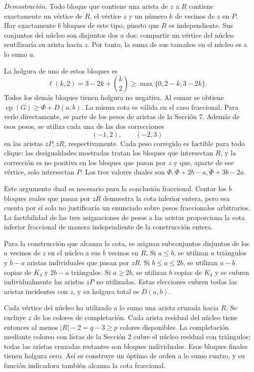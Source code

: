 \documentclass[spanish,11pt,a4paper]{article}
\begin{document}
\emph{Demostración.} Todo bloque que contiene una arista de \(z\) a
\(R\) contiene exactamente un vértice de \(R\), el vértice \(z\) y un
número \(k\) de vecinos de \(z\) en \(P\). Hay exactamente \(b\) bloques
de este tipo, puesto que \(R\) es independiente. Sus conjuntos del
núcleo son disjuntos dos a dos: compartir un vértice del núcleo
reutilizaría su arista hacia \(z\). Por tanto, la suma de sus tamaños en
el núcleo es a lo sumo \(a\).

La holgura de uno de estos bloques es \[
\ell(k,2)=3-2k+\binom k2\ge\max\{0,2-k,3-2k\}.
\] Todos los demás bloques tienen holgura no negativa. Al sumar se
obtiene \(\operatorname{cp}(G)\ge\Phi+D(a,b)\). La misma cota es válida
en el caso fraccional. Para verlo directamente, se parte de los pesos de
aristas de la Sección 7. Además de esos pesos, se utiliza cada una de
las dos correcciones \[
(-1,2),\qquad (-2,3)
\] en las aristas \(zP,zR\), respectivamente. Cada peso corregido es
factible para todo clique: las desigualdades mostradas tratan los
bloques que intersectan \(R\), y la corrección es no positiva en los
bloques que pasan por \(z\) y que, aparte de ese vértice, solo
intersectan \(P\). Los tres valores duales son
\(\Phi,\Phi+2b-a,\Phi+3b-2a\).

Este argumento dual es necesario para la conclusión fraccional. Contar
los \(b\) bloques reales que pasan por \(zR\) demuestra la cota inferior
entera, pero esa cuenta por sí sola no justificaría un enunciado sobre
pesos fraccionales arbitrarios. La factibilidad de las tres asignaciones
de pesos a las aristas proporciona la cota inferior fraccional de manera
independiente de la construcción entera.

Para la construcción que alcanza la cota, se asignan subconjuntos
disjuntos de los \(a\) vecinos de \(z\) en el núcleo a sus \(b\) vecinos
en \(R\). Si \(a\le b\), se utilizan \(a\) triángulos y \(b-a\) aristas
individuales que pasan por \(zR\). Si \(b\le a\le2b\), se utilizan
\(a-b\) copias de \(K_4\) y \(2b-a\) triángulos. Si \(a\ge2b\), se
utilizan \(b\) copias de \(K_4\) y se cubren individualmente las aristas
\(zP\) no utilizadas. Estas elecciones cubren todas las aristas
incidentes con \(z\), y su holgura total es \(D(a,b)\).

Cada vértice del núcleo ha utilizado a lo sumo una arista cruzada hacia
\(R\). Se excluye \(z\) de los colores de completación. Cada arista
residual del núcleo tiene entonces al menos \(|R|-2=q-3\ge p\) colores
disponibles. La completación mediante coloreo con listas de la Sección 2
cubre el núcleo residual con triángulos; todas las aristas cruzadas
restantes son bloques individuales. Esos bloques finales tienen holgura
cero. Así se construye un óptimo de orden a lo sumo cuatro, y su función
indicadora también alcanza la cota fraccional.
\end{document}

